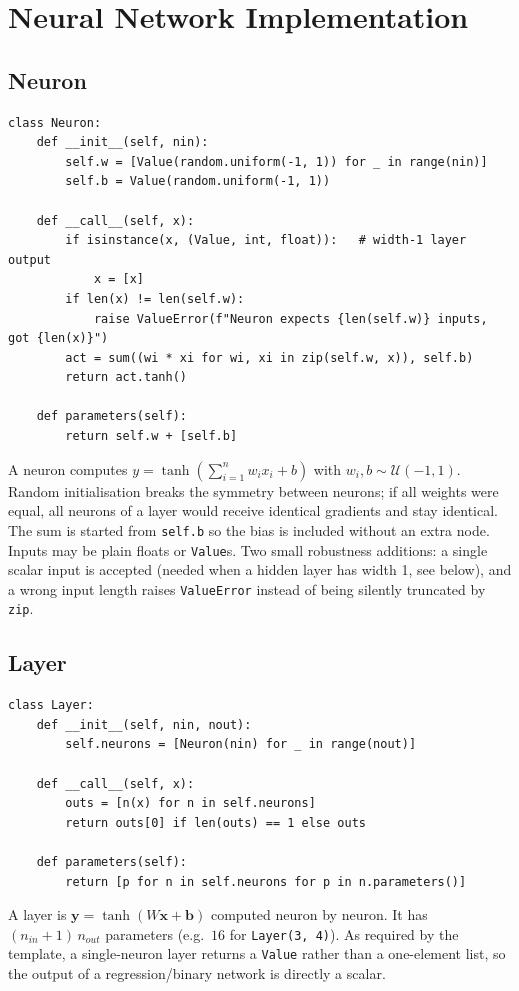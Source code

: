 \documentclass[11pt,a4paper]{article}
\begin{document}
\section{Neural Network Implementation}
\subsection{Neuron}
\begin{lstlisting}
class Neuron:
    def __init__(self, nin):
        self.w = [Value(random.uniform(-1, 1)) for _ in range(nin)]
        self.b = Value(random.uniform(-1, 1))

    def __call__(self, x):
        if isinstance(x, (Value, int, float)):   # width-1 layer output
            x = [x]
        if len(x) != len(self.w):
            raise ValueError(f"Neuron expects {len(self.w)} inputs, got {len(x)}")
        act = sum((wi * xi for wi, xi in zip(self.w, x)), self.b)
        return act.tanh()

    def parameters(self):
        return self.w + [self.b]
\end{lstlisting}
A neuron computes $y = \tanh\!\left(\sum_{i=1}^{n} w_i x_i + b\right)$ with
$w_i, b \sim \mathcal{U}(-1,1)$. Random initialisation breaks the symmetry between neurons; if all weights
were equal, all neurons of a layer would receive identical gradients and stay identical. The sum is started from
\texttt{self.b} so the bias is included without an extra node. Inputs may be plain floats or \texttt{Value}s.
Two small robustness additions: a single scalar input is accepted (needed when a hidden layer has width 1, see
below), and a wrong input length raises \texttt{ValueError} instead of being silently truncated by \texttt{zip}.

\subsection{Layer}
\begin{lstlisting}
class Layer:
    def __init__(self, nin, nout):
        self.neurons = [Neuron(nin) for _ in range(nout)]

    def __call__(self, x):
        outs = [n(x) for n in self.neurons]
        return outs[0] if len(outs) == 1 else outs

    def parameters(self):
        return [p for n in self.neurons for p in n.parameters()]
\end{lstlisting}
A layer is $\mathbf{y} = \tanh(W\mathbf{x} + \mathbf{b})$ computed neuron by neuron. It has $(n_{in}+1)\,n_{out}$
parameters (e.g.\ $16$ for \texttt{Layer(3, 4)}). As required by the template, a single-neuron layer returns a
\texttt{Value} rather than a one-element list, so the output of a regression/binary network is directly a scalar.
\end{document}
